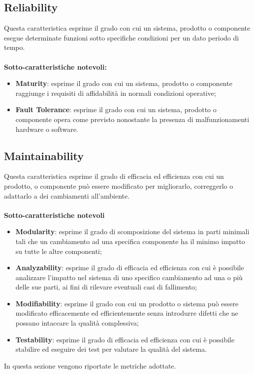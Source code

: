 \subsection{Reliability}
Questa caratteristica esprime il grado con cui un sistema, prodotto o componente esegue determinate funzioni sotto specifiche condizioni per un dato periodo di tempo. \\ \\
\textbf{Sotto-caratteristiche notevoli:}
\begin{itemize}
	\item{\textbf{Maturity}}: esprime il grado con cui un sistema, prodotto o componente raggiunge i requisiti di affidabilità in normali condizioni operative;
	\item{\textbf{Fault Tolerance}}: esprime il grado con cui un sistema, prodotto o componente opera come previsto nonostante la presenza di malfunzionamenti hardware o software.
\end{itemize}

\subsection{Maintainability}
Questa caratteristica esprime il grado di efficacia ed efficienza con cui un prodotto, o componente può essere modificato per migliorarlo, correggerlo o adattarlo a dei cambiamenti all'ambiente. \\ \\
\textbf{Sotto-caratteristiche notevoli}
\begin{itemize}
	\item{\textbf{Modularity}}: esprime il grado di scomposizione del sistema in parti minimali tali che un cambiamento ad una specifica componente ha il minimo impatto su tutte le altre componenti;
	\item{\textbf{Analyzability}}: esprime il grado di efficacia ed efficienza con cui è possibile analizzare l'impatto nel sistema di uno specifico cambiamento ad una o più delle sue parti, ai fini di rilevare eventuali casi di fallimento;
	\item{\textbf{Modifiability}}: esprime il grado con cui un prodotto o sistema può essere modificato efficacemente ed efficientemente senza introdurre difetti che ne possano intaccare la qualità complessiva;
	\item{\textbf{Testability}}: esprime il grado di efficacia ed efficienza con cui è possibile stabilire ed eseguire dei test per valutare la qualità del sistema.
\end{itemize}
\newpage
{}
In questa sezione vengono riportate le metriche adottate.
